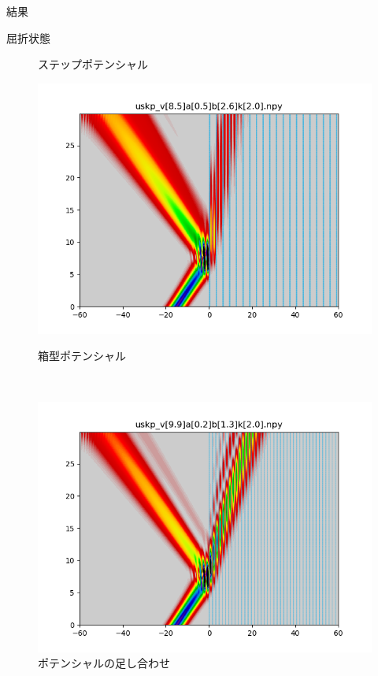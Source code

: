 \documentclass[a4paper, lualatex]{bxjsarticle}
\begin{document}
\begin{section}{結果}
\begin{subsection}{屈折状態}
\begin{figure}[h]
\begin{minipage}{0.5\hsize}
                \caption{ステップポテンシャル}
            \end{minipage}
            \begin{minipage}{0.5\hsize}
                \centering
                \includegraphics[width=0.9\hsize]{kussetsu2.png}
                \caption{箱型ポテンシャル}
            \end{minipage}\\
            \begin{minipage}{0.5\hsize}
                \centering
                \includegraphics[width=0.9\hsize]{kussetsu3.png}
                \caption{ポテンシャルの足し合わせ}
            \end{minipage}
            \begin{minipage}{0.5\hsize}
                \centering

\end{minipage}
\end{figure}
\end{subsection}
\end{section}
\end{document}
